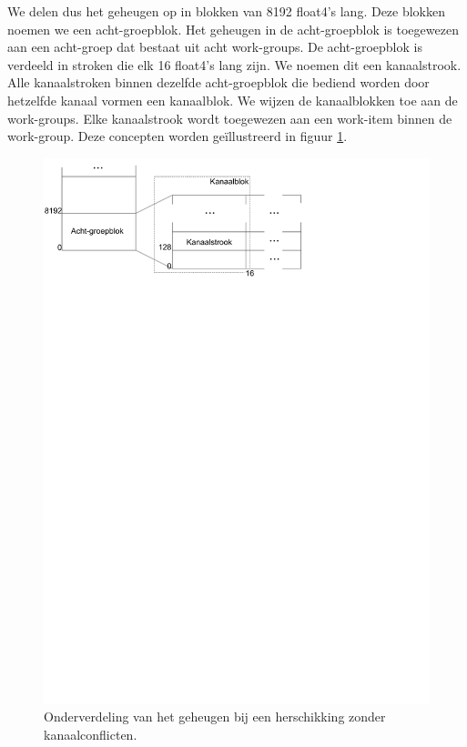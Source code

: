We delen dus het geheugen op in blokken van 8192 float4's lang. Deze blokken noemen we een acht-groepblok. Het geheugen in de acht-groepblok is toegewezen aan een acht-groep dat bestaat uit acht work-groups. De acht-groepblok is verdeeld in stroken die elk 16 float4's lang zijn. We noemen dit een kanaalstrook. Alle kanaalstroken binnen dezelfde acht-groepblok die bediend worden door hetzelfde kanaal vormen een kanaalblok. We wijzen de kanaalblokken toe aan de work-groups. Elke kanaalstrook wordt toegewezen aan een work-item binnen de work-group. Deze concepten worden ge\"illustreerd in figuur \ref{iso}.

\begin{figure}
\centering
\includegraphics[trim=0 23cm 6.5cm 0, clip]{iso}
\caption{\label{iso}Onderverdeling van het geheugen bij een herschikking zonder kanaalconflicten.}
\end{figure}

